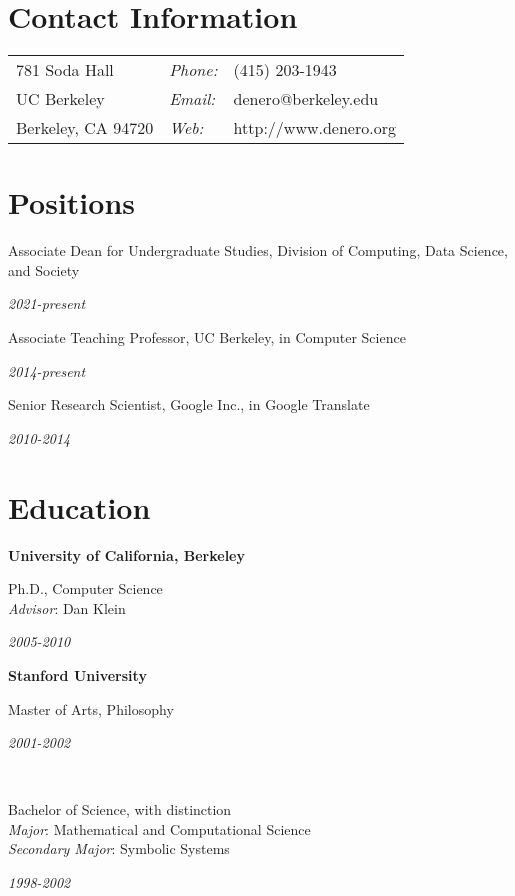 \documentclass[margin,line]{res}
\newcommand{\dated}[2]{\parbox[t]{4.4in}{#1} \hspace{0.4in}
											 \parbox[t]{1in}{ {\it #2 } } }
\begin{document}

\begin{resume}

\section{\sc Contact Information}
\vspace{.05in}
\begin{tabular}{@{}p{2in}lp{4in}}
781 Soda Hall         & {\it Phone:} & (415) 203-1943        \\
UC Berkeley           & {\it Email:} & denero@berkeley.edu   \\
Berkeley, CA  94720   & {\it Web:}   & http://www.denero.org \\
\end{tabular}

\section{\sc Positions}

	\dated{Associate Dean for Undergraduate Studies, Division of Computing, Data Science, and Society}
	{ 2021-present }

	\dated{Associate Teaching Professor, UC Berkeley, in Computer Science}
	{ 2014-present }

	\dated{Senior Research Scientist, Google Inc., in Google Translate}
	{ 2010-2014 }

\section{\sc Education}

	{\bf University of California, Berkeley} \\
	\dated{Ph.D., Computer Science \\
	\hspace*{1em} {\it Advisor}: Dan Klein}{ 2005-2010 }

	{\bf Stanford University} \\
	\dated{Master of Arts, Philosophy\vspace{0.12in}}{ 2001-2002 } \\
	\dated{Bachelor of Science, with distinction \\
	\hspace*{1em} {\it Major}: Mathematical and Computational Science \\
	\hspace*{1em} {\it Secondary Major}: Symbolic Systems}{ 1998-2002 }


\end{resume}
\end{document}
